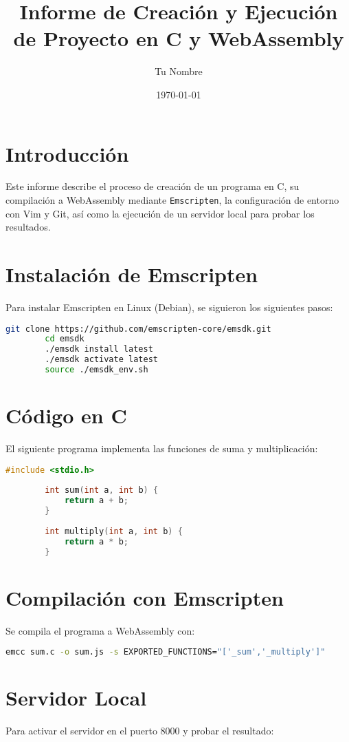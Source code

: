 \documentclass[a4paper,12pt]{article}
\title{Informe de Creación y Ejecución de Proyecto en C y WebAssembly}
\author{Tu Nombre}
\date{\today}
\begin{document}
	
	\maketitle
	
	\section{Introducción}
	Este informe describe el proceso de creación de un programa en C,
	su compilación a WebAssembly mediante \texttt{Emscripten}, la
	configuración de entorno con Vim y Git, así como la ejecución de un
	servidor local para probar los resultados.
	
	\section{Instalación de Emscripten}
	Para instalar Emscripten en Linux (Debian), se siguieron los
	siguientes pasos:
	
	\begin{lstlisting}[language=bash]
		git clone https://github.com/emscripten-core/emsdk.git
		cd emsdk
		./emsdk install latest
		./emsdk activate latest
		source ./emsdk_env.sh
	\end{lstlisting}
	
	\section{Código en C}
	El siguiente programa implementa las funciones de suma y multiplicación:
	
	\begin{lstlisting}[language=C]
		#include <stdio.h>
		
		int sum(int a, int b) {
			return a + b;
		}
		
		int multiply(int a, int b) {
			return a * b;
		}
	\end{lstlisting}
	
	\section{Compilación con Emscripten}
	Se compila el programa a WebAssembly con:
	
	\begin{lstlisting}[language=bash]
		emcc sum.c -o sum.js -s EXPORTED_FUNCTIONS="['_sum','_multiply']"
	\end{lstlisting}
	
	\section{Servidor Local}
	Para activar el servidor en el puerto 8000 y probar el resultado:
	
\end{document}
